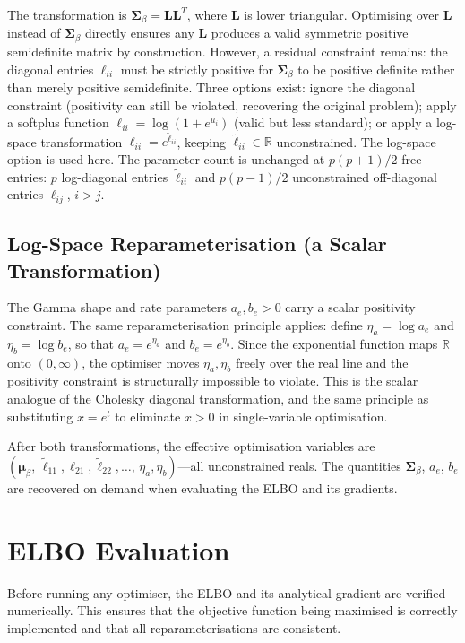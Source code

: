 \documentclass[11pt,a4paper]{article}
\newcommand{\R}{\mathbb{R}}
\begin{document}
The transformation is $\bm{\Sigma}_\beta = \bm{L}\bm{L}^T$, where $\bm{L}$ is lower triangular. Optimising over $\bm{L}$ instead of $\bm{\Sigma}_\beta$ directly ensures any $\bm{L}$ produces a valid symmetric positive semidefinite matrix by construction. However, a residual constraint remains: the diagonal entries $\ell_{ii}$ must be strictly positive for $\bm{\Sigma}_\beta$ to be positive definite rather than merely positive semidefinite. Three options exist: ignore the diagonal constraint (positivity can still be violated, recovering the original problem); apply a softplus function $\ell_{ii} = \log(1 + e^{u_i})$ (valid but less standard); or apply a log-space transformation $\ell_{ii} = e^{\tilde{\ell}_{ii}}$, keeping $\tilde{\ell}_{ii} \in \R$ unconstrained. The log-space option is used here. The parameter count is unchanged at $p(p+1)/2$ free entries: $p$ log-diagonal entries $\tilde{\ell}_{ii}$ and $p(p-1)/2$ unconstrained off-diagonal entries $\ell_{ij}$, $i > j$.

\subsection*{Log-Space Reparameterisation (a Scalar Transformation)}

The Gamma shape and rate parameters $a_e, b_e > 0$ carry a scalar positivity constraint. The same reparameterisation principle applies: define $\eta_a = \log a_e$ and $\eta_b = \log b_e$, so that $a_e = e^{\eta_a}$ and $b_e = e^{\eta_b}$. Since the exponential function maps $\R$ onto $(0, \infty)$, the optimiser moves $\eta_a, \eta_b$ freely over the real line and the positivity constraint is structurally impossible to violate. This is the scalar analogue of the Cholesky diagonal transformation, and the same principle as substituting $x = e^t$ to eliminate $x > 0$ in single-variable optimisation.

After both transformations, the effective optimisation variables are $(\bm{\mu}_\beta,\, \tilde{\ell}_{11}, \ell_{21}, \tilde{\ell}_{22}, \ldots,\, \eta_a, \eta_b)$---all unconstrained reals. The quantities $\bm{\Sigma}_\beta$, $a_e$, $b_e$ are recovered on demand when evaluating the ELBO and its gradients.


\section{ELBO Evaluation}
\label{sec:elbo-evaluation}

Before running any optimiser, the ELBO and its analytical gradient are verified numerically.
This ensures that the objective function being maximised is correctly implemented and that all
reparameterisations are consistent.
\end{document}

